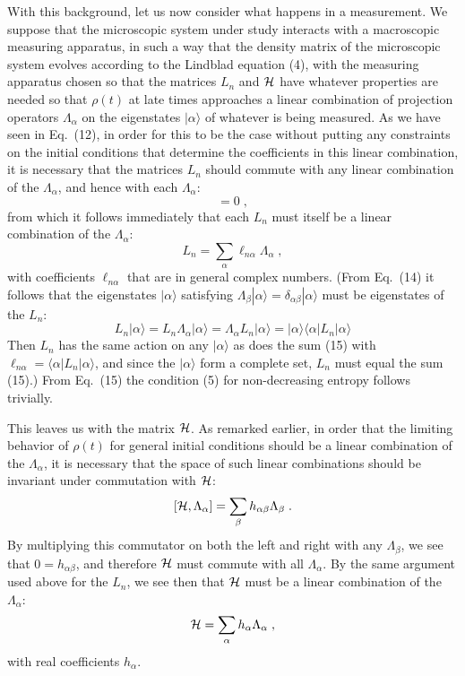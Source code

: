 \documentclass[12pt]{article}
\begin{document}
With this background, let us now consider what happens in a measurement.  We suppose that the microscopic system under study interacts with a macroscopic measuring apparatus, in such a way that the density matrix of the microscopic system evolves according to the Lindblad equation (4), with the measuring apparatus chosen so that the matrices $L_n$ and ${\cal H}$ have whatever properties are needed so that $\rho(t)$ at late times approaches a linear combination of projection operators $\Lambda_\alpha$ on the eigenstates $|\alpha\rangle$ of whatever is being measured.  As we have seen in Eq.~(12), in order for this to be the case without putting any constraints on the initial conditions that determine the coefficients in this linear combination, it is necessary that the matrices $L_n$ should commute with any linear combination of the $\Lambda_\alpha$, and hence with each 
$\Lambda_\alpha$:
\begin{equation}[L_n,\Lambda_\alpha]=0\;,          \end{equation}
from which it follows immediately that each $L_n$ must itself be a linear combination of the $\Lambda_\alpha$:
\begin{equation}
 L_n=\sum_\alpha \ell_{n\alpha}\Lambda_\alpha\;,
\end{equation}
with coefficients $\ell_{n\alpha}$ that are in general complex numbers.
(From Eq.~(14) it follows that  the eigenstates $|\alpha\rangle$  satisfying $\Lambda_\beta|\alpha\rangle=\delta_{\alpha\beta}|\alpha\rangle$ must be eigenstates of the $L_n$:
$$ L_n|\alpha\rangle=L_n\Lambda_\alpha|\alpha\rangle=\Lambda_\alpha L_n|\alpha\rangle=|\alpha\rangle \langle \alpha|L_n|\alpha\rangle$$
Then $L_n$ has the same action on any $|\alpha\rangle$ as does the sum (15) with $\ell_{n\alpha}= \langle \alpha|L_n|\alpha\rangle$, and since the $|\alpha\rangle$ form a complete set, $L_n$ must equal the sum (15).)  From Eq.~(15) the condition (5) for non-decreasing entropy follows trivially.

This leaves us with the matrix ${\cal H}$.  As remarked earlier, in order that the limiting behavior of $\rho(t)$ for general initial conditions should be a linear combination of the $\Lambda_\alpha$, it is necessary that the space of such linear combinations should be invariant under commutation with ${\cal H}$:
$$
[{\cal H},\Lambda_\alpha]=\sum_\beta h_{\alpha\beta}\Lambda_\beta\;.
$$
By multiplying this commutator on both the left and right with any $\Lambda_\beta$, we see that $0=h_{\alpha\beta}$, and therefore ${\cal H}$ must commute with all $\Lambda_\alpha$.  By the same argument used above for the $L_n$, we see then that ${\cal H}$ must be a linear combination of the $\Lambda_\alpha$:
\begin{equation}
{\cal H}=\sum_\alpha h_\alpha\Lambda_\alpha\;,
\end{equation}
with real coefficients $h_\alpha$.
\end{document}
